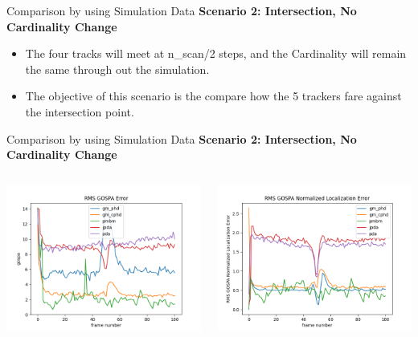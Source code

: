 \documentclass[12pt]{beamer}
\let\olditem\item
\renewcommand\item{\olditem\justifying}
\begin{document}
\begin{frame}{Comparison by using Simulation Data}
\textbf{Scenario 2: Intersection, No Cardinality Change}
	\begin{itemize}
		    \item The four tracks will meet at n\_scan/2 steps, and the Cardinality will remain the same through out the simulation. 
		    \item The objective of this scenario is the compare how the 5 trackers fare against the intersection point.
	\end{itemize}
\end{frame}

\begin{frame}{Comparison by using Simulation Data}
\textbf{Scenario 2: Intersection, No Cardinality Change}
\begin{columns}[t]
  \begin{column}{0.5\linewidth}
      \centering
      \includegraphics[width=\linewidth,height=\textheight,keepaspectratio]{real_data/scenario2/gospa.png}\\
  \end{column}
    \begin{column}{0.5\linewidth}
      \centering
      \includegraphics[width=\linewidth,height=\textheight,keepaspectratio]{real_data/scenario2/gospa_localization.png}\\

\end{column}
\end{columns}
\end{frame}
\end{document}
